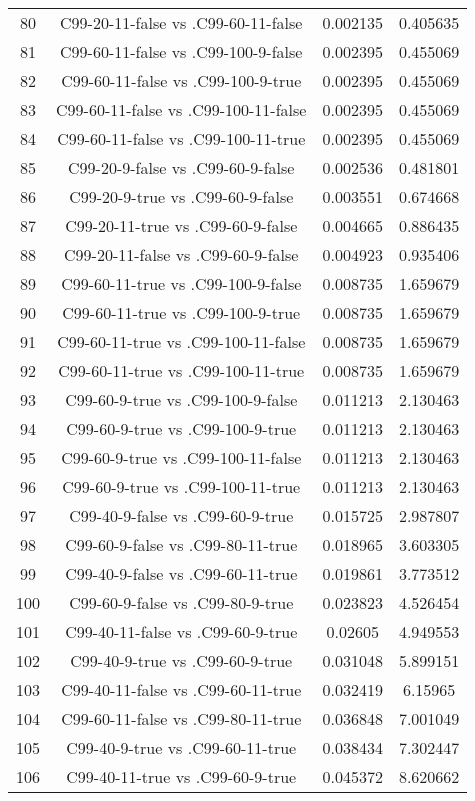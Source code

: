 \documentclass[a4paper,10pt]{article}
\begin{document}
\begin{landscape}
\begin{table}[!htp]
\begin{tabular}{cccc}
80&C99-20-11-false vs .C99-60-11-false&0.002135&0.405635\\
81&C99-60-11-false vs .C99-100-9-false&0.002395&0.455069\\
82&C99-60-11-false vs .C99-100-9-true&0.002395&0.455069\\
83&C99-60-11-false vs .C99-100-11-false&0.002395&0.455069\\
84&C99-60-11-false vs .C99-100-11-true&0.002395&0.455069\\
85&C99-20-9-false vs .C99-60-9-false&0.002536&0.481801\\
86&C99-20-9-true vs .C99-60-9-false&0.003551&0.674668\\
87&C99-20-11-true vs .C99-60-9-false&0.004665&0.886435\\
88&C99-20-11-false vs .C99-60-9-false&0.004923&0.935406\\
89&C99-60-11-true vs .C99-100-9-false&0.008735&1.659679\\
90&C99-60-11-true vs .C99-100-9-true&0.008735&1.659679\\
91&C99-60-11-true vs .C99-100-11-false&0.008735&1.659679\\
92&C99-60-11-true vs .C99-100-11-true&0.008735&1.659679\\
93&C99-60-9-true vs .C99-100-9-false&0.011213&2.130463\\
94&C99-60-9-true vs .C99-100-9-true&0.011213&2.130463\\
95&C99-60-9-true vs .C99-100-11-false&0.011213&2.130463\\
96&C99-60-9-true vs .C99-100-11-true&0.011213&2.130463\\
97&C99-40-9-false vs .C99-60-9-true&0.015725&2.987807\\
98&C99-60-9-false vs .C99-80-11-true&0.018965&3.603305\\
99&C99-40-9-false vs .C99-60-11-true&0.019861&3.773512\\
100&C99-60-9-false vs .C99-80-9-true&0.023823&4.526454\\
101&C99-40-11-false vs .C99-60-9-true&0.02605&4.949553\\
102&C99-40-9-true vs .C99-60-9-true&0.031048&5.899151\\
103&C99-40-11-false vs .C99-60-11-true&0.032419&6.15965\\
104&C99-60-11-false vs .C99-80-11-true&0.036848&7.001049\\
105&C99-40-9-true vs .C99-60-11-true&0.038434&7.302447\\
106&C99-40-11-true vs .C99-60-9-true&0.045372&8.620662\\

\end{tabular}
\end{table}
\end{landscape}
\end{document}
